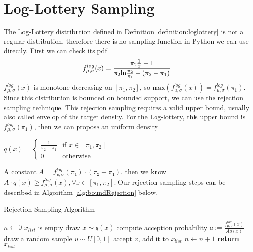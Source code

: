 \section{Log-Lottery Sampling}
The Log-Lottery distribution defined in Definition \ref{definition:loglottery} is not a regular distribution, therefore there is no sampling function in Python we can use directly. First we can check its pdf
\begin{equation}\notag
	f^{log}_{\mu,\sigma} (x) =  \frac{\pi_2\frac{1}{x} -1}{\pi_2 \text{ln} \frac{\pi_2}{\pi_1} - (\pi_2-\pi_1)}
\end{equation} 
$f^{log}_{\mu,\sigma} (x)$ is monotone decreasing on $[\pi_1,\pi_2]$, so $\text{max}(f^{log}_{\mu,\sigma} (x)) = f^{log}_{\mu,\sigma} (\pi_1)$.
Since this distribution is bounded on bounded support, we can use the rejection sampling technique. This rejection sampling requires a valid upper bound, usually also called envelop of the target density. For the Log-lottery, this upper bound is $f^{log}_{\mu,\sigma} (\pi_1)$, then we can propose an uniform density
\begin{center}
	$q(x) = \begin{cases} \frac{1}{\pi_2 - \pi_1}  & \text{if } x \in [\pi_1, \pi_2] \\ 0   & \text{otherwise } \end{cases}$
\end{center}
A constant $A = f^{log}_{\mu,\sigma} (\pi_1)\cdot (\pi_2 - \pi_1)$, then we know $A \cdot q(x) \geqslant	f^{log}_{\mu,\sigma} (x) , 	\forall x \in [\pi_1,\pi_2]$. Our rejection sampling steps can be described in Algorithm \ref{alg:boundRejection} below.
\begin{algorithm}
	\caption{Rejection Sampling Algorithm}\label{alg:boundRejection}
	\begin{algorithmic}[1]
		\State $n \gets 0$
		\State $x_{list}$ is empty
			\State draw $x \sim q(x)$		
			\State compute acception probability $a := \frac{f^{log}_{\mu,\sigma} (x) }{Aq(x)}$
			\State draw a random sample $u \sim U[0,1]$
				\State accept $x$, add it to $x_{list}$
				\State $n\gets n+1$	
			\EndIf
		\EndWhile
		\State \textbf{return} $x_{list}$
		\EndProcedure
	\end{algorithmic}
\end{algorithm}


